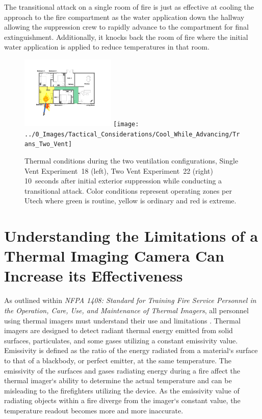 \documentclass[12pt,oneside]{book}
\begin{document}
The transitional attack on a single room of fire is just as effective at cooling the approach to the fire compartment as the water application down the hallway allowing the suppression crew to rapidly advance to the compartment for final extinguishment. Additionally, it knocks back the room of fire where the initial water application is applied to reduce temperatures in that room.

\begin{figure}[H]
\centering
\includegraphics[width=0.4\textwidth]{../0_Images/Tactical_Considerations/Cool_While_Advancing/Trans_Single_Vent}
\texttt{[image: ../0\_Images/Tactical\_Considerations/Cool\_While\_Advancing/Trans\_Two\_Vent]}
\caption[Thermal Conditions - Transitional Attack]{Thermal conditions during the two ventilation configurations, Single Vent Experiment~18 (left), Two Vent Experiment~22 (right) 10~seconds after initial exterior suppression while conducting a transitional attack. Color conditions represent operating zones per Utech \cite{Utech_Firefighter_Clothing} where green is routine, yellow is ordinary and red is extreme.}
\label{fig:Thermal_Classes_Approach_Transitional}
\end{figure}

\section{Understanding the Limitations of a Thermal Imaging Camera Can Increase its Effectiveness} \label{tc:understanding_thermal_imagers}
As outlined within \textit{NFPA 1408: Standard for Training Fire Service Personnel in the Operation, Care, Use, and Maintenance of Thermal Imagers}, all personnel using thermal imagers must understand their use and limitations \cite{NFPA1408}. Thermal imagers are designed to detect radiant thermal energy emitted from solid surfaces, particulates, and some gases utilizing a constant emissivity value. Emissivity is defined as the ratio of the energy radiated from a material`s surface to that of a blackbody, or perfect emitter, at the same temperature. The emissivity of the surfaces and gases radiating energy during a fire affect the thermal imager`s ability to determine the actual temperature and can be misleading to the firefighters utilizing the device. As the emissivity value of radiating objects within a fire diverge from the imager`s constant value, the temperature readout becomes more and more inaccurate.
\end{document}
